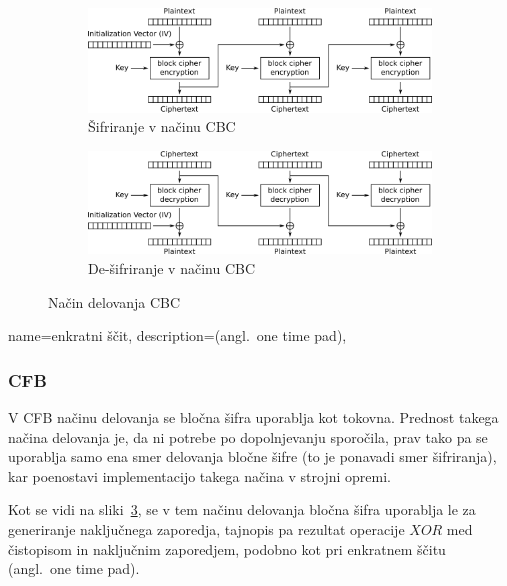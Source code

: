 \documentclass[12pt,a4paper,openany]{book}
\begin{document}
\begin{figure}[ht!]
  \centering
  \begin{subfigure}[b]{\textwidth}
    \includegraphics[width=\textwidth]{images/CBC_encryption}
    \caption{Šifriranje v načinu \gls{CBC}}
\label{fig:cbcenc}
  \end{subfigure}
  \begin{subfigure}[b]{\textwidth}
    \includegraphics[width=\textwidth]{images/CBC_decryption}
    \caption{De-šifriranje v načinu \gls{CBC}}
\label{fig:cbcdec}
  \end{subfigure}
  \caption{Način delovanja \gls{CBC}}
\label{fig:cfbmode}
\end{figure}


{
  name=enkratni ščit,
  description={(angl.\ one time pad)},
}

\subsubsection{CFB}
\label{subs:CFB}

V \gls{CFB} načinu delovanja se bločna šifra uporablja kot tokovna. Prednost takega načina delovanja je, da ni potrebe po dopolnjevanju sporočila, prav tako pa se uporablja samo ena smer delovanja bločne šifre (to je ponavadi smer šifriranja), kar poenostavi implementacijo takega načina v strojni opremi.

Kot se vidi na sliki~\ref{fig:cfbmode}, se v tem načinu delovanja bločna šifra uporablja le za generiranje naključnega zaporedja, tajnopis pa rezultat operacije $XOR$ med čistopisom in naključnim zaporedjem, podobno kot pri enkratnem ščitu (angl.\ one time pad).
\end{document}
